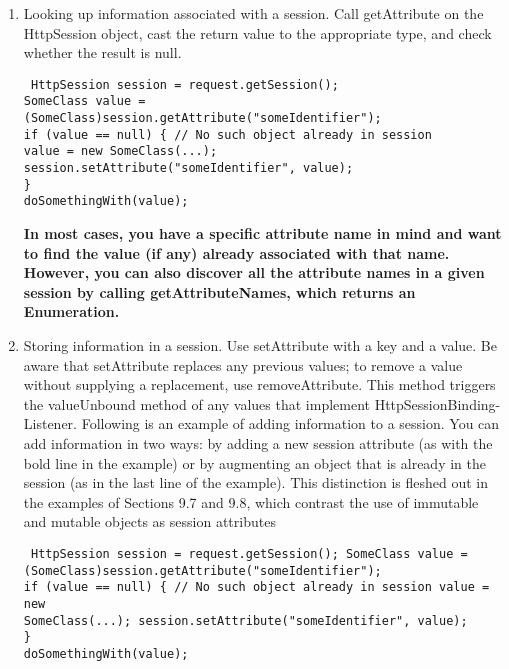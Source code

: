 \documentclass[a4paper,10pt]{scrreprt}
\begin{document}
{\begin{enumerate}
\item Looking up information associated with a session. Call getAttribute on the
HttpSession object, cast the return value to the appropriate type, and check whether the
result is null.
\begin{lstlisting}
 HttpSession session = request.getSession();
SomeClass value = (SomeClass)session.getAttribute("someIdentifier");
if (value == null) { // No such object already in session
value = new SomeClass(...);
session.setAttribute("someIdentifier", value);
}
doSomethingWith(value);
\end{lstlisting}
\textbf{In most cases, you have a specific attribute name in mind and want to find the value (if any) already associated 
with
that name. However, you can also discover all the attribute names in a given session by calling getAttributeNames,
which returns an Enumeration.}

\item Storing information in a session. Use setAttribute with a key and a value.
Be aware that setAttribute replaces any previous values; to remove a value without supplying a replacement, use
removeAttribute. This method triggers the valueUnbound method of any values that implement HttpSessionBinding-
Listener.
Following is an example of adding information to a session. You can add information in two ways: by adding a new
session attribute (as with the bold line in the example) or by augmenting an object that is already in the session (as 
in
the last line of the example). This distinction is fleshed out in the examples of Sections 9.7 and 9.8, which contrast
the use of immutable and mutable objects as session attributes
\begin{lstlisting}
 HttpSession session = request.getSession(); SomeClass value =
(SomeClass)session.getAttribute("someIdentifier");
if (value == null) { // No such object already in session value = new
SomeClass(...); session.setAttribute("someIdentifier", value);
}
doSomethingWith(value);
\end{lstlisting}


\end{enumerate}}
\end{document}
